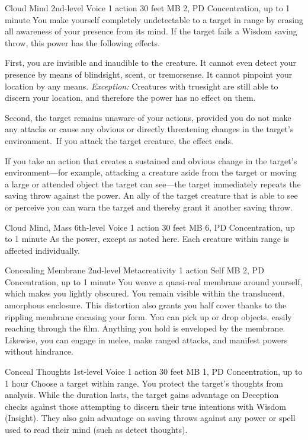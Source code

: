 \DndPowerHeader%
  {Cloud Mind}
  {2nd-level Voice}
  {1 action}
  {30 feet}
  {MB 2, PD \lvltwo}
  {Concentration, up to 1 minute}
You make yourself completely undetectable to a target in range
by erasing all awareness of your presence from its mind.
If the target fails a Wisdom saving throw,
this power has the following effects.

First, you are invisible and inaudible to the creature.
It cannot even detect your presence by means of blindsight,
scent, or tremorsense.
It cannot pinpoint your location by any means.
\textit{Exception:} Creatures with truesight are still
able to discern your location,
and therefore the power has no effect on them.
  
Second, the target remains unaware of your actions,
provided you do not make any attacks or cause any obvious
or directly threatening changes in the target's environment.\
If you attack the target creature, the effect ends.
  
If you take an action that creates a sustained and obvious change
in the target's environment---for example, attacking a creature
aside from the target or moving a large or attended object
the target can see---the target immediately repeats the
saving throw against the power.
An ally of the target creature that is able to see or perceive you
can warn the target and thereby grant it another saving throw.

\DndPowerHeader%
  {Cloud Mind, Mass}
  {6th-level Voice}
  {1 action}
  {30 feet}
  {MB 6, PD \lvlsix}
  {Concentration, up to 1 minute}
As the  power,
except as noted here.
Each creature within range is affected individually.

\DndPowerHeader%
  {Concealing Membrane}
  {2nd-level Metacreativity}
  {1 action}
  {Self}
  {MB 2, PD \lvltwo}
  {Concentration, up to 1 minute}
  You weave a quasi-real membrane around yourself,
  which makes you lightly obscured.
  You remain visible within the translucent, amorphous enclosure.
  This distortion also grants you half cover
  thanks to the rippling membrane encasing your form.
  You can pick up or drop objects, easily reaching through the film.
  Anything you hold is enveloped by the membrane.
  Likewise, you can engage in melee, make ranged attacks,
  and manifest powers without hindrance.

\DndPowerHeader%
  {Conceal Thoughts}
  {1st-level Voice}
  {1 action}
  {30 feet}
  {MB 1, PD \lvlone}
  {Concentration, up to 1 hour}
Choose a target within range.
You protect the target's thoughts from analysis.
While the duration lasts, the target gains advantage on
Deception checks against those attempting to discern their
true intentions with Wisdom (Insight).
They also gain advantage on saving throws against any power or spell
used to read their mind (such as detect thoughts).

